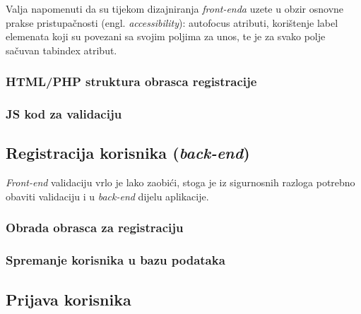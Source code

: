       Valja napomenuti da su tijekom dizajniranja \textit{front-enda} uzete u
      obzir osnovne prakse pristupačnosti (engl. \textit{accessibility}):
      autofocus atributi, korištenje label elemenata koji su povezani sa svojim
      poljima za unos, te je za svako polje sačuvan tabindex atribut.

      \subsubsection{HTML/PHP struktura obrasca registracije}

        

      \subsubsection{JS kod za validaciju}

        

  \subsection{Registracija korisnika (\textit{back-end})}

    \textit{Front-end} validaciju vrlo je lako zaobići, stoga je iz
    sigurnosnih razloga potrebno obaviti validaciju i u \textit{back-end}
    dijelu aplikacije.

    \subsubsection{Obrada obrasca za registraciju}

      

    \subsubsection{Spremanje korisnika u bazu podataka}

      

  \subsection{Prijava korisnika}

